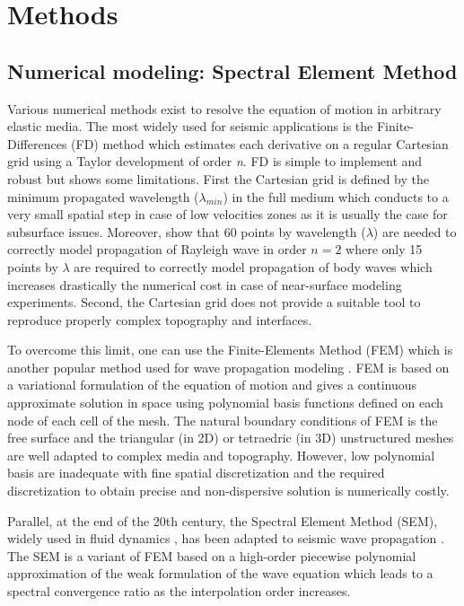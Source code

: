 \documentclass[manuscript,revised]{geophysics}
\begin{document}
\section{Methods}

\subsection{Numerical modeling: Spectral Element Method}

\noindent Various numerical methods exist to resolve the equation of motion in arbitrary elastic media. The most widely used for seismic applications is the Finite-Differences (FD) method \citep{Virieux_PSV_1986,Levander_PSV_1988,Robertsson_FDM_1994,Pratt_EWM_1990,Stekl_VEM_1998,Saenger_FDM_2004} which estimates each derivative on a regular Cartesian grid using a Taylor development \citep{Moczo_FDM_2004} of order \textit{n}. FD is simple to implement and robust but shows some limitations. First the Cartesian grid is defined by the minimum propagated wavelength ($\lambda_{min}$) in the full medium which conducts to a very small spatial step in case of low velocities zones as it is usually the case for subsurface issues. Moreover, \citet{Saenger_FDM_2000} show that 60 points by wavelength ($\lambda$) are needed to correctly model propagation of Rayleigh wave in order $n=2$ where only 15 points by $\lambda$ are required to correctly model propagation of body waves which increases drastically the numerical cost in case of near-surface modeling experiments. Second, the Cartesian grid does not provide a suitable tool to reproduce properly complex topography and interfaces. 

\noindent To overcome this limit, one can use the Finite-Elements Method (FEM) which is another popular method used for wave propagation modeling \citep{Lysmer_FEM_1972,Seron_FEM_1990,Hulbert_FEM_1990}. FEM is based on a variational formulation of the equation of motion and gives a continuous approximate solution in space using polynomial basis functions defined on each node of each cell of the mesh. The natural boundary conditions of FEM is the free surface and the triangular (in 2D) or tetraedric (in 3D) unstructured meshes are well adapted to complex media and topography. However, low polynomial basis are inadequate with fine spatial discretization and the required discretization to obtain precise and non-dispersive solution is numerically costly. 

\noindent Parallel, at the end of the 20th century, the Spectral Element Method (SEM), widely used in fluid dynamics \citep{Patera_SEM_1984,Korczak_SEM_1986,Karniadakis_FEM_1989}, has been adapted to seismic wave propagation \citep{Komatitsch_SEM_1998,Komatitsch_ISM_1999,Komatitsch_SEM_2005,Festa_PML_2005}. The SEM is a variant of FEM based on a high-order piecewise polynomial approximation of the weak formulation of the wave equation which leads to a spectral convergence ratio as the interpolation order increases. 
\end{document}
